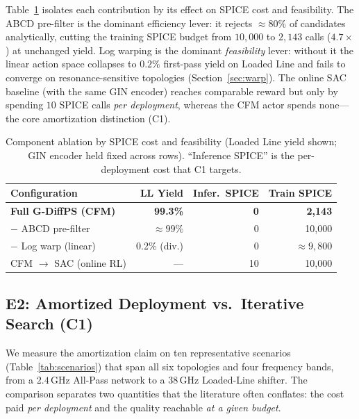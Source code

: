 \documentclass[sigconf,anonymous,review]{acmart}
\begin{document}
Table~\ref{tab:ablation} isolates each contribution by its effect on SPICE
cost and feasibility.  The ABCD pre-filter is the dominant efficiency lever:
it rejects ${\approx}80\%$ of candidates analytically, cutting the training
SPICE budget from $10{,}000$ to $2{,}143$ calls ($4.7{\times}$) at unchanged
yield.  Log warping is the dominant \emph{feasibility} lever: without it the
linear action space collapses to $0.2\%$ first-pass yield on Loaded Line and
fails to converge on resonance-sensitive topologies (Section~\ref{sec:warp}).
The online SAC baseline (with the same GIN encoder) reaches comparable reward
but only by spending $10$ SPICE calls \emph{per deployment}, whereas the CFM
actor spends none---the core amortization distinction (C1).

\begin{table}[t]
  \caption{Component ablation by SPICE cost and feasibility (Loaded Line
           yield shown; GIN encoder held fixed across rows).  ``Inference
           SPICE'' is the per-deployment cost that C1 targets.}
  \label{tab:ablation}
  \centering\small
  \begin{tabular}{lrrr}
    \toprule
    Configuration & LL Yield & Infer.\ SPICE & Train SPICE \\
    \midrule
    \textbf{Full G-DiffPS (CFM)}  & \textbf{99.3\%} & \textbf{0}  & \textbf{2,143} \\
    $-$ ABCD pre-filter           & ${\approx}99\%$ & 0           & 10,000         \\
    $-$ Log warp (linear)         & 0.2\% (div.)    & 0           & ${\approx}9{,}800$ \\
    CFM $\to$ SAC (online RL)     & ---             & 10          & 10,000         \\
    \bottomrule
  \end{tabular}
\end{table}

\subsection{E2: Amortized Deployment vs.\ Iterative Search (C1)}
\label{sec:exp_amortize}

We measure the amortization claim on ten representative scenarios
(Table~\ref{tab:scenarios}) that span all six topologies and four frequency
bands, from a $2.4$\,GHz All-Pass network to a $38$\,GHz Loaded-Line shifter.
The comparison separates two quantities that the literature often conflates:
the cost paid \emph{per deployment} and the quality reachable \emph{at a given
budget}.
\end{document}

